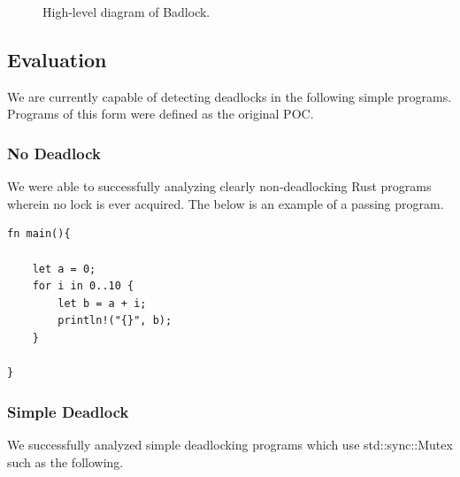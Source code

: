 \documentclass[conference]{IEEEtran}
\begin{document}
\begin{figure}[ht]
    \centering
    \caption{High-level diagram of Badlock.}
    \label{fig:badlock_sys}
\end{figure}

\subsection{Evaluation}
We are currently capable of detecting deadlocks in the following simple programs. Programs of this form were defined as the original POC.

\subsubsection{No Deadlock}
We were able to successfully analyzing clearly non-deadlocking Rust programs wherein no lock is ever acquired. The below is an example of a passing program.

\begin{lstlisting}[caption={Program Without a Deadlock}, label=lst:rust_example]
fn main(){

    let a = 0;
    for i in 0..10 {
        let b = a + i;
        println!("{}", b);
    }
    
}
\end{lstlisting}

\subsubsection{Simple Deadlock}
We successfully analyzed simple deadlocking programs which use std::sync::Mutex such as the following.
\end{document}
